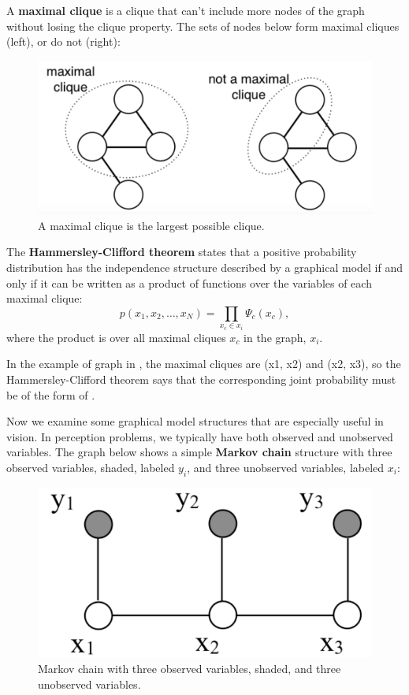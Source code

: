 A {\bf maximal clique}
 is a clique that
can't include more nodes of the graph without losing the clique property.
The sets of nodes below form maximal cliques (left), or do not (right):
\begin{figure}
\centerline{\includegraphics[width=0.4\linewidth]{figures/graphical_models/cliques2.pdf}}
\caption{A maximal clique is the largest possible clique.}
\end{figure}

The {\bf Hammersley-Clifford theorem} \cite{Hammersley1971}
states that a positive probability distribution has the independence structure described by
a graphical model if and only if it can be written as a product of functions
over the variables of each maximal clique:
\begin{equation}
p(x_1, x_2, \ldots, x_N) =  \prod_{x_c  \in x_i} \Psi_{c} (x_c),
\end{equation}
where the product is over all maximal cliques $x_c$ in the graph, $x_i$.

In the example of graph in \fig{\ref{graph:3node}}, the maximal cliques  are (x1,
x2) and (x2, x3), so the Hammersley-Clifford theorem says that the
corresponding joint probability must be of the form of
\eqn{\ref{eq:x1x2x3}}. 

Now we examine some graphical model structures that are especially useful in vision.
In perception problems, we typically have both observed and 
unobserved variables.  The graph below shows a simple {\bf Markov chain} \cite{Gagniuc1989}  structure
with three observed variables, shaded, labeled $y_i$, and three
unobserved variables, labeled $x_i$:
\begin{figure}
\centerline{\includegraphics[width=0.36\linewidth]{figures/graphical_models/x1x2x3y1y2y3.pdf}} 
\caption{Markov chain  with three observed variables, shaded, and three unobserved variables.}
\label{fig:chain}
\end{figure}


